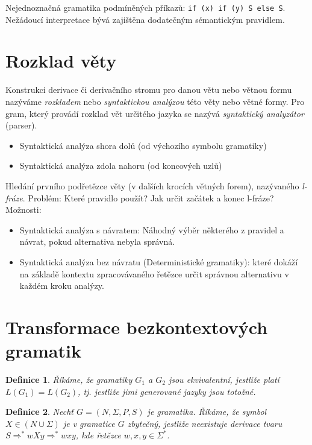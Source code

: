 \documentclass[a4paper, 11pt]{report}
\newtheorem{mydef}{Definice}[chapter]
\begin{document}
Nejednoznačná gramatika podmíněných příkazů: \texttt{if (x) if (y) S else S}. Nežádoucí interpretace bývá zajištěna dodatečným sémantickým pravidlem.

\section{Rozklad věty}
Konstrukci derivace či derivačního stromu pro danou větu nebo větnou formu nazýváme \emph{rozkladem} nebo \emph{syntaktickou analýzou} této věty nebo větné formy. Pro gram, který provádí rozklad vět určitého jazyka se nazývá \emph{syntaktický analyzátor} (parser).

\begin{itemize}
	\item Syntaktická analýza shora dolů (od výchozího symbolu gramatiky)
	\item Syntaktická analýza zdola nahoru (od koncových uzlů)
\end{itemize}

Hledání prvního podřetězce věty (v dalších krocích větných forem), nazývaného \emph{l-fráze}. Problém: Které pravidlo použít? Jak určit začátek a konec l-fráze? Možnosti:
\begin{itemize}
	\item Syntaktická analýza s návratem: Náhodný výběr některého z pravidel a návrat, pokud alternativa nebyla správná. 
	\item Syntaktická analýza bez návratu (Deterministické gramatiky): které dokáží na základě kontextu zpracovávaného řetězce určit správnou alternativu v každém kroku analýzy.
\end{itemize}

\section{Transformace bezkontextových gramatik}

\begin{mydef}
Říkáme, že gramatiky $G_1$ a $G_2$ jsou ekvivalentní, jestliže platí $L(G_1) = L(G_2)$, tj. jestliže jimi generované jazyky jsou totožné.
\end{mydef}

\begin{mydef}
Nechť $G=(N,\Sigma,P,S)$ je gramatika. Říkáme, že symbol $X \in (N \cup \Sigma)$ je v gramatice $G$ zbytečný, jestliže neexistuje derivace tvaru $S \Rightarrow^* w X y \Rightarrow^* wxy$, kde řetězce $w, x, y \in \Sigma^*$.
\end{mydef}
\end{document}
